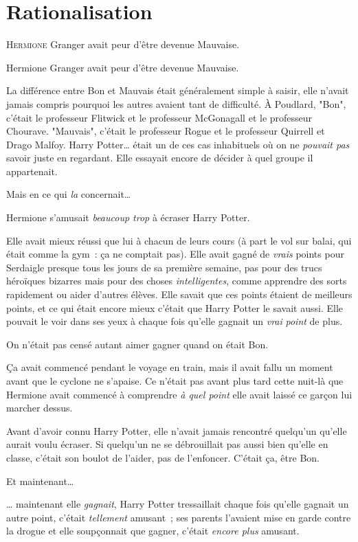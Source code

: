 \chapter{Rationalisation}

\lettrine{H}{ermione} Granger avait peur d'être devenue Mauvaise.

Hermione Granger avait peur d'être devenue Mauvaise.

La différence entre Bon et Mauvais était généralement simple à saisir, elle n'avait jamais compris pourquoi les autres avaient tant de difficulté. À Poudlard, "Bon", c'était le professeur Flitwick et le professeur McGonagall et le professeur Chourave. "Mauvais", c'était le professeur Rogue et le professeur Quirrell et Drago Malfoy. Harry Potter… était un de ces cas inhabituels où on ne \emph{pouvait pas} savoir juste en regardant. Elle essayait encore de décider à quel groupe il appartenait.

Mais en ce qui \emph{la} concernait…

Hermione s'amusait \emph{beaucoup trop} à écraser Harry Potter.

Elle avait mieux réussi que lui à chacun de leurs cours (à part le vol sur balai, qui était comme la gym~: ça ne comptait pas). Elle avait gagné de \emph{vrais} points pour Serdaigle presque tous les jours de sa première semaine, pas pour des trucs héroïques bizarres mais pour des choses \emph{intelligentes}, comme apprendre des sorts rapidement ou aider d'autres élèves. Elle savait que ces points étaient de meilleurs points, et ce qui était encore mieux c'était que Harry Potter le savait aussi. Elle pouvait le voir dans ses yeux à chaque fois qu'elle gagnait un \emph{vrai} \emph{point} de plus.

On n'était pas censé autant aimer gagner quand on était Bon.

Ça avait commencé pendant le voyage en train, mais il avait fallu un moment avant que le cyclone ne s'apaise. Ce n'était pas avant plus tard cette nuit-là que Hermione avait commencé à comprendre \emph{à quel point} elle avait laissé ce garçon lui marcher dessus.

Avant d'avoir connu Harry Potter, elle n'avait jamais rencontré quelqu'un qu'elle aurait voulu écraser. Si quelqu'un ne se débrouillait pas aussi bien qu'elle en classe, c'était son boulot de l'aider, pas de l'enfoncer. C'était ça, être Bon.

Et maintenant…

… maintenant elle \emph{gagnait}, Harry Potter tressaillait chaque fois qu'elle gagnait un autre point, c'était \emph{tellement} amusant~; ses parents l'avaient mise en garde contre la drogue et elle soupçonnait que gagner, c'était \emph{encore plus} amusant.

